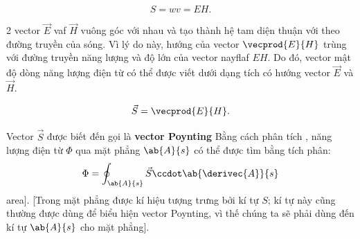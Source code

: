 \begin{equation}\label{eq:15_28}
    S = w v = EH.
\end{equation}

\noindent

2 vector $\vec{E}$ vaf $\vec{H}$ vuông góc với nhau và tạo thành hệ tam diện thuận với theo đường truyền của sóng. Vì lý do này, hướng của vector $\vecprod{E}{H}$ trùng với đường truyền năng lượng và độ lớn của vector nayflaf $EH$. Do đó, vector mật độ dòng năng lượng điện từ có thể được viết dưới dạng tích có hướng vector $\vec{E}$ và $\vec{H}$.

\begin{equation}\label{eq:15_29}
    \vec{S} = \vecprod{E}{H}.
\end{equation}

\noindent
Vector $\vec{S}$ được biết đến gọi là \textbf{vector Poynting}
Bằng cách phân tích , năng lượng điện từ $\Phi$ qua mặt phẳng $\ab{A}{s}$ có thể được tìm bằng tích phân: 
\begin{equation}\label{eq:15_30}
    \Phi = \oint_{\ab{A}{s}} \vec{S} \ccdot \ab{\derivec{A}}{s}
\end{equation}
\noindent
area].
[Trong  mặt phẳng được kí hiệu tượng trưng bởi kí tự $S$; kí tự này cũng thường được dùng để biểu hiện vector Poynting, vì thế chúng ta sẽ phải dùng đến kí tự $\ab{A}{s}$ cho mặt phẳng].


